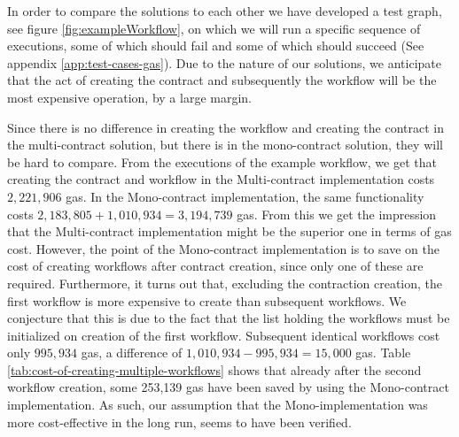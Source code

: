 \documentclass{article}
\begin{document}
	In order to compare the solutions to each other we have developed a test graph, see figure \ref{fig:exampleWorkflow}, on which we will run a specific sequence of executions, some of which should fail and some of which should succeed (See appendix \ref{app:test-cases-gas}).
	Due to the nature of our solutions, we anticipate that the act of creating the contract and subsequently the workflow will be the most expensive operation, by a large margin.

	Since there is no difference in creating the workflow and creating the contract in the multi-contract solution, but there is in the mono-contract solution, they will be hard to compare.
	From the executions of the example workflow, we get that creating the contract and workflow in the Multi-contract implementation costs $2,221,906$ gas. 
	In the Mono-contract implementation, the same functionality costs $2,183,805 + 1,010,934 = 3,194,739$ gas.
	From this we get the impression that the Multi-contract implementation might be the superior one in terms of gas cost.
	However, the point of the Mono-contract implementation is to save on the cost of creating workflows after contract creation, since only one of these are required.
	Furthermore, it turns out that, excluding the contraction creation, the first workflow is more expensive to create than subsequent workflows.
	We conjecture that this is due to the fact that the list holding the workflows must be initialized on creation of the first workflow.
	Subsequent identical workflows cost only $995,934$ gas, a difference of $1,010,934 - 995,934 = 15,000$ gas.
	Table \ref{tab:cost-of-creating-multiple-workflows} shows that already after the second workflow creation, some 253,139 gas have been saved by using the Mono-contract implementation.
	As such, our assumption that the Mono-implementation was more cost-effective in the long run, seems to have been verified.  
\end{document}
